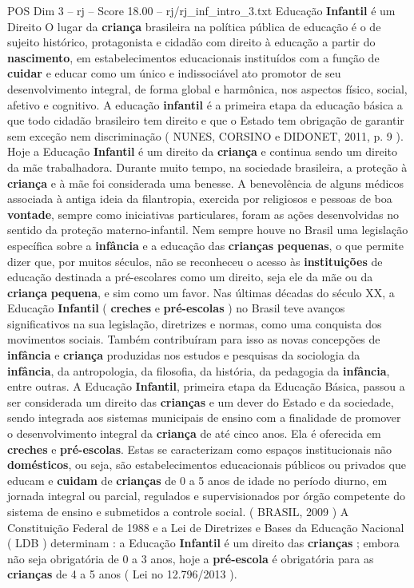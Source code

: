 \begin{textsample}{POS Dim 3 – rj – Score 18.00 – rj/rj\_inf\_intro\_3.txt}  \label{ex:f3_pos_015}
Educação \textbf{Infantil} é um Direito O lugar da \textbf{criança} brasileira na política pública de educação é o de sujeito histórico, protagonista e cidadão com direito à educação a partir do \textbf{nascimento}, em estabelecimentos educacionais instituídos com a função de \textbf{cuidar} e educar como um único e indissociável ato promotor de seu desenvolvimento integral, de forma global e harmônica, nos aspectos físico, social, afetivo e cognitivo.
A educação \textbf{infantil} é a primeira etapa da educação básica a que todo cidadão brasileiro tem direito e que o Estado tem obrigação de garantir sem exceção nem discriminação ( NUNES, CORSINO e DIDONET, 2011, p. 9 ).
Hoje a Educação \textbf{Infantil} é um direito da \textbf{criança} e continua sendo um direito da mãe trabalhadora.
Durante muito tempo, na sociedade brasileira, a proteção à \textbf{criança} e à mãe foi considerada uma benesse.
A benevolência de alguns médicos associada à antiga ideia da filantropia, exercida por religiosos e pessoas de boa \textbf{vontade}, sempre como iniciativas particulares, foram as ações desenvolvidas no sentido da proteção materno-infantil.
Nem sempre houve no Brasil uma legislação específica sobre a \textbf{infância} e a educação das \textbf{crianças} \textbf{pequenas}, o que permite dizer que, por muitos séculos, não se reconheceu o acesso às \textbf{instituições} de educação destinada a pré-escolares como um direito, seja ele da mãe ou da \textbf{criança} \textbf{pequena}, e sim como um favor.
Nas últimas décadas do século XX, a Educação \textbf{Infantil} ( \textbf{creches} e \textbf{pré-escolas} ) no Brasil teve avanços significativos na sua legislação, diretrizes e normas, como uma conquista dos movimentos sociais.
Também contribuíram para isso as novas concepções de \textbf{infância} e \textbf{criança} produzidas nos estudos e pesquisas da sociologia da \textbf{infância}, da antropologia, da filosofia, da história, da pedagogia da \textbf{infância}, entre outras.
A Educação \textbf{Infantil}, primeira etapa da Educação Básica, passou a ser considerada um direito das \textbf{crianças} e um dever do Estado e da sociedade, sendo integrada aos sistemas municipais de ensino com a finalidade de promover o desenvolvimento integral da \textbf{criança} de até cinco anos.
Ela é oferecida em \textbf{creches} e \textbf{pré-escolas}.
Estas se caracterizam como espaços institucionais não \textbf{domésticos}, ou seja, são estabelecimentos educacionais públicos ou privados que educam e \textbf{cuidam} de \textbf{crianças} de 0 a 5 anos de idade no período diurno, em jornada integral ou parcial, regulados e supervisionados por órgão competente do sistema de ensino e submetidos a controle social. ( BRASIL, 2009 ) A Constituição Federal de 1988 e a Lei de Diretrizes e Bases da Educação Nacional ( LDB ) determinam : a Educação \textbf{Infantil} é um direito das \textbf{crianças} ; embora não seja obrigatória de 0 a 3 anos, hoje a \textbf{pré-escola} é obrigatória para as \textbf{crianças} de 4 a 5 anos ( Lei no 12.796/2013 ).

\end{textsample}
